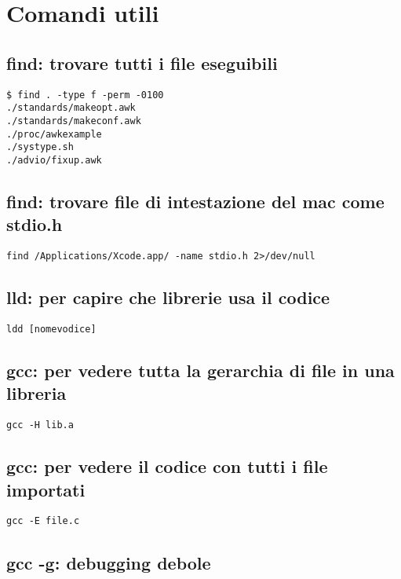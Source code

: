 \section{Comandi utili}

\subsection{find: trovare tutti i file eseguibili}
	
\begin{lstlisting}
$ find . -type f -perm -0100
./standards/makeopt.awk
./standards/makeconf.awk
./proc/awkexample
./systype.sh
./advio/fixup.awk
\end{lstlisting}


\subsection{find: trovare file di intestazione del mac come stdio.h}

\begin{lstlisting}
find /Applications/Xcode.app/ -name stdio.h 2>/dev/null
\end{lstlisting}


\subsection{lld: per capire che librerie usa il codice}

\begin{lstlisting}
ldd [nomevodice]
\end{lstlisting}


\subsection{gcc: per vedere tutta la gerarchia di file in una libreria}

\begin{lstlisting}
gcc -H lib.a
\end{lstlisting}


\subsection{gcc: per vedere il codice con tutti i file importati}

\begin{lstlisting}
gcc -E file.c
\end{lstlisting}


\subsection{gcc -g: debugging debole}

